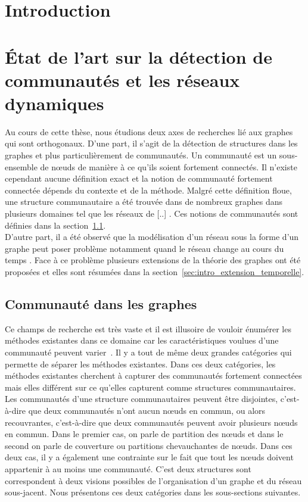 
\chapter*{Introduction}

\chapter{État de l'art sur la détection de communautés et les réseaux dynamiques}
\minitoc
Au cours de cette thèse, nous étudions deux axes de recherches lié aux graphes qui sont orthogonaux.
D'une part, il s'agit de la détection de structures dans les graphes et plus particulièrement de communautés.
Un communauté est un sous-ensemble de n\oe uds de manière à ce qu'ils soient fortement connectés.
Il n'existe cependant aucune définition exact et la notion de communauté fortement connectée dépends du contexte et de la méthode.
Malgré cette définition floue, une structure communautaire a été trouvée dans de nombreux graphes dans plusieurs domaines tel que les réseaux de [..] \REF.
Ces notions de communautés sont définies dans la section~\ref{sec:intro_communaute}.\\

D'autre part, il a été observé que la modélisation d'un réseau sous la forme d'un graphe peut poser problème notamment quand le réseau change au cours du temps \REF.
Face à ce problème plusieurs extensions de la théorie des graphes ont été proposées et elles sont résumées dans la section~\ref{sec:intro_extension_temporelle}.



\section{Communauté dans les graphes}
\label{sec:intro_communaute}

Ce champs de recherche est très vaste et il est illusoire de vouloir énumérer les méthodes existantes dans ce domaine car les caractéristiques voulues d'une communauté peuvent varier~\cite{Coscia2011}.
Il y a tout de même deux grandes catégories qui permette de séparer les méthodes existantes.
Dans ces deux catégories, les méthodes existantes cherchent à capturer 
des communautés fortement connectées mais elles différent sur ce qu'elles capturent comme structures communautaires.
Les communautés d'une structure communautaires peuvent être disjointes, c'est-à-dire que deux communautés n'ont aucun n\oe uds en commun, ou alors recouvrantes, c'est-à-dire que deux communautés peuvent avoir plusieurs n\oe uds en commun.
Dans le premier cas, on parle de partition des n\oe uds et dans le second on parle de couverture ou partitions chevauchantes de n\oe uds.
Dans ces deux cas, il y a également une contrainte sur le fait que tout les n\oe uds doivent appartenir à au moins une communauté.
C'est deux structures sont correspondent à deux visions possibles de l'organisation d'un graphe et du réseau sous-jacent.
Nous présentons ces deux catégories dans les sous-sections suivantes.


